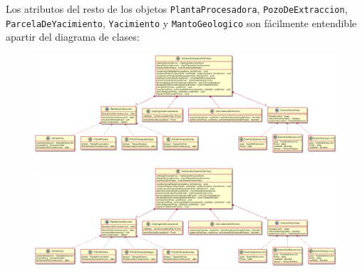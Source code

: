 Los atributos del resto de los objetos \texttt{PlantaProcesadora}, \texttt{PozoDeExtraccion}, \texttt{ParcelaDeYacimiento}, \texttt{Yacimiento} y \texttt{MantoGeologico} son f\'acilmente entendible apartir del diagrama de clases:

\begin{figure}[H]
  \centering
  \hspace{-3.5cm}\includegraphics[angle=90,scale=0.4]{Partes/Imagenes/diagrama_alternativo1.png}
\end{figure}

\begin{figure}[H]
  \centering
  \hspace{-3.5cm}\includegraphics[angle=90,scale=0.5]{Partes/Imagenes/diagrama_alternativo1.png}
\end{figure}

